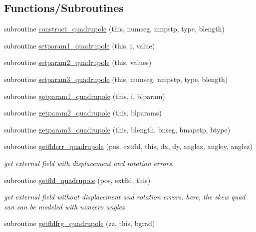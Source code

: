 \subsection*{Functions/\+Subroutines}
\begin{DoxyCompactItemize}
\item 
subroutine \mbox{\hyperlink{namespacequadrupoleclass_afebabbf596b8330dcdbc2741bb939b5c}{construct\+\_\+quadrupole}} (this, numseg, nmpstp, type, blength)
\item 
subroutine \mbox{\hyperlink{namespacequadrupoleclass_a34d611929c447e03e1c12c2f72888ca5}{setparam1\+\_\+quadrupole}} (this, i, value)
\item 
subroutine \mbox{\hyperlink{namespacequadrupoleclass_a400dc2305f0aca6ab6d6b5475a91363a}{setparam2\+\_\+quadrupole}} (this, values)
\item 
subroutine \mbox{\hyperlink{namespacequadrupoleclass_a6e3465265973203b8452b1b2463a2e4b}{setparam3\+\_\+quadrupole}} (this, numseg, nmpstp, type, blength)
\item 
subroutine \mbox{\hyperlink{namespacequadrupoleclass_a48e1ded5cfc486c78a47d556fd008e29}{getparam1\+\_\+quadrupole}} (this, i, blparam)
\item 
subroutine \mbox{\hyperlink{namespacequadrupoleclass_a8991350fe610b73bca6787f4c528753c}{getparam2\+\_\+quadrupole}} (this, blparams)
\item 
subroutine \mbox{\hyperlink{namespacequadrupoleclass_ae5c8a42ae81e07dcb9eb91681d28f04e}{getparam3\+\_\+quadrupole}} (this, blength, bnseg, bmapstp, btype)
\item 
subroutine \mbox{\hyperlink{namespacequadrupoleclass_a41791f03ec33f0255e54ebc7b9519170}{getflderr\+\_\+quadrupole}} (pos, extfld, this, dx, dy, anglex, angley, anglez)
\begin{DoxyCompactList}\small\item\em get external field with displacement and rotation errors. \end{DoxyCompactList}\item 
subroutine \mbox{\hyperlink{namespacequadrupoleclass_a1d1bf0b4ea88a1cd0c0832a178fc80e5}{getfld\+\_\+quadrupole}} (pos, extfld, this)
\begin{DoxyCompactList}\small\item\em get external field without displacement and rotation errors. here, the skew quad can can be modeled with nonzero anglez \end{DoxyCompactList}\item 
subroutine \mbox{\hyperlink{namespacequadrupoleclass_a28a961157d94669d59f8c6f024995899}{getfldfrg\+\_\+quadrupole}} (zz, this, bgrad)

\end{DoxyCompactItemize}

